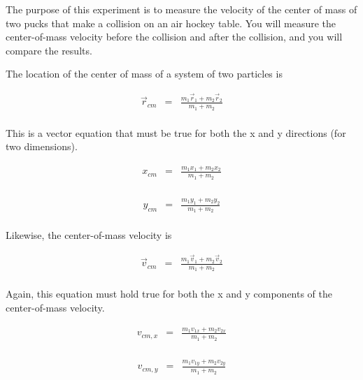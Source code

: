 
\apparatus
{}

\longgoal
The purpose of this experiment is to measure the velocity of the center of mass of two pucks that make a collision on an air hockey table. You will measure the center-of-mass velocity before the collision and after the collision, and you will compare the results.

\introduction

The location of the center of mass of a system of two particles is

\begin{eqnarray*}
	\vec{r}_{cm}&=&\frac{m_1\vec{r}_1 + m_2\vec{r}_2}{m_1+m_2} \\
\end{eqnarray*}

This is a vector equation that must be true for both the x and y directions (for two dimensions).

\begin{eqnarray*}
	x_{cm} &=&\frac{m_1x_1 + m_2x_2}{m_1+m_2} \\
\end{eqnarray*}

\begin{eqnarray*}
	y_{cm} &=&\frac{m_1y_1 + m_2y_2}{m_1+m_2} \\
\end{eqnarray*}

Likewise, the center-of-mass velocity is

\begin{eqnarray*}
	\vec{v}_{cm}&=&\frac{m_1\vec{v}_1 + m_2\vec{v}_2}{m_1+m_2} \\
\end{eqnarray*}

Again, this equation must hold true for both the x and y components of the center-of-mass velocity.

\begin{eqnarray*}
	{v}_{cm,x}&=&\frac{m_1{v}_{1x} + m_2{v}_{2x}}{m_1+m_2} \\
\end{eqnarray*}

\begin{eqnarray*}
	{v}_{cm,y}&=&\frac{m_1{v}_{1y} + m_2{v}_{2y}}{m_1+m_2} \\
\end{eqnarray*}

\procedure

